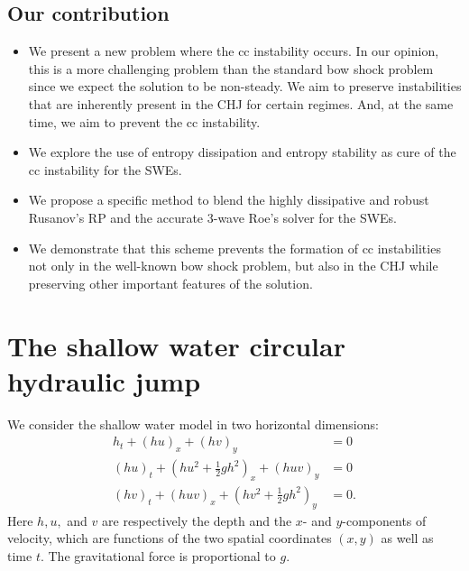 \documentclass[preprint, 11pt]{article}
\begin{document}
\subsection{Our contribution}
\begin{itemize}
\item We present a new problem where the cc instability occurs. In our opinion, this is a more challenging
  problem than the standard bow shock problem since we expect the solution to be non-steady.
  We aim to preserve instabilities that are inherently present in the CHJ for certain regimes. And,
  at the same time, we aim to prevent the cc instability.
\item We explore the use of entropy dissipation and entropy stability as cure of the cc instability for the SWEs.
\item We propose a specific method to blend the highly dissipative and robust Rusanov's RP and the
  accurate 3-wave Roe's solver for the SWEs.
\item We demonstrate that this scheme prevents the formation of cc instabilities not only
  in the well-known bow shock problem, but also in the CHJ while preserving other important features of
  the solution.
\end{itemize}


\section{The shallow water circular hydraulic jump}
We consider the shallow water model in two horizontal dimensions:
\begin{subequations} \label{eq:sw}
\begin{align}
    h_t + (hu)_x + (hv)_y & = 0 \\
    (hu)_t + \left(hu^2 + \frac{1}{2}gh^2\right)_x + (huv)_y & = 0 \\
    (hv)_t + (huv)_x + \left(hv^2 + \frac{1}{2}gh^2\right)_y & = 0.
\end{align}
\end{subequations}
Here $h, u,$ and $v$ are respectively the depth and the $x$- and $y$-components of
velocity, which are functions of the two spatial coordinates $(x,y)$ as well as time $t$.
The gravitational force is proportional to $g$.
\end{document}
